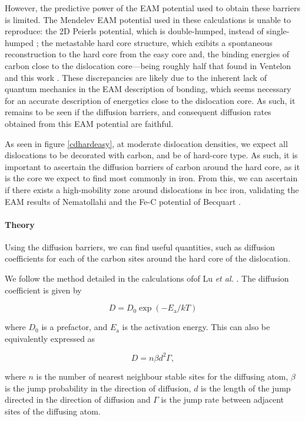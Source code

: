 \documentclass[a4paper,11pt]{article}
\numberwithin{equation}{chapter}
\numberwithin{listing}{chapter}
\begin{document}
However, the predictive power of the EAM potential used to obtain these barriers is limited. The
Mendelev EAM potential used in these calculations is unable to reproduce: the 2D Peierls
potential, which is double-humped, instead of single-humped \cite{Mendelev2003}; the metastable
hard core structure, which exibits a spontaneous reconstruction to the hard core from the easy core and, the binding energies of
carbon close to the dislocation core---being roughly half that found in Ventelon and this work
\cite{Becquart2007,Ventelon2015}. These discrepancies are likely due to the inherent lack of
quantum mechanics in the EAM description of bonding, which seems necessary for an accurate
description of energetics close to the dislocation core. As such, it remains to be seen if the
diffusion barriers, and consequent diffusion rates obtained from this EAM potential are faithful.

As seen in figure \ref{cdhardeasy}, at moderate dislocation densities, we expect all dislocations
to be decorated with carbon, and be of hard-core type. As such, it is important to ascertain the
diffusion barriers of carbon around the hard core, as it is the core we expect to find most
commonly in iron. From this, we can ascertain if there exists a high-mobility zone around
dislocations in bcc iron, validating the EAM results of Nematollahi and the Fe-C potential of Becquart \cite{Nematollahi2016,Becquart2007}.

\paragraph{Theory}
\label{sec:orgb57211d}

Using the diffusion barriers, we can find useful quantities, such as diffusion coefficients for each
of the carbon sites around the hard core of the dislocation.

We follow the method detailed in the calculations ofof Lu \emph{et al.} \cite{Lu2013a}. The diffusion
coefficient is given by

\[ D = D_0 \exp \left( -E_{\text{a}}/kT \right)  \]

where \(D_0\) is a prefactor, and \(E_{\text{a} }\) is the activation
energy. This can also be equivalently expressed as

\[ D = n\beta d^2 \Gamma, \]

where \(n\) is the number of nearest neighbour stable sites for the
diffusing atom, \(\beta\) is the jump probability in the direction of
diffusion, \(d\) is the length of the jump directed in the direction of
diffusion and \(\Gamma\) is the jump rate between adjacent sites of the
diffusing atom.
\end{document}
